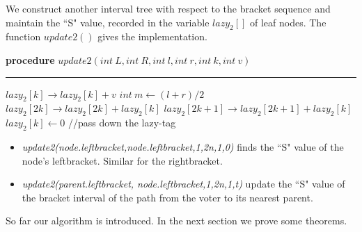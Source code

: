 We construct another interval tree with respect to the bracket sequence  and maintain the ``S" value,  recorded in the variable $lazy_2[]$ of leaf nodes. The function $update2()$ gives the implementation.
\begin{algorithm}
	\textbf{procedure} $update2(int~L,int ~R, int~l, int~r, int~k, int~v)$
	\hrule
	{
       $lazy_2[k] \rightarrow lazy_2[k]+v$
	}
	{
		$int~m \leftarrow (l+r)/2$\;
		$lazy_2[2k] \rightarrow lazy_2[2k]+lazy_2[k]$\;
		$lazy_2[2k+1]\rightarrow lazy_2[2k+1]+lazy_2[k]$\;
		$lazy_2[k] \leftarrow 0$
			{\color{gray}
		//pass down the lazy-tag}\;
    }
\end{algorithm}
\begin{itemize}
	\item {\em update2(node.leftbracket,node.leftbracket,1,2n,1,0)} finds the ``S" value of the node's leftbracket. Similar for the rightbracket. 
	\item {\em update2(parent.leftbracket, node.leftbracket,1,2n,1,t)} update the ``S" value of the bracket interval of the path from the voter to its nearest parent.
\end{itemize}
So far our algorithm is introduced. In the next section we prove some theorems.